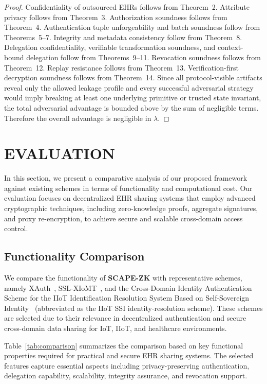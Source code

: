 \documentclass[conference]{IEEEtran}
\begin{document}
\begin{proof}
Confidentiality of outsourced EHRs follows from Theorem~2. Attribute privacy follows from Theorem~3. Authorization soundness follows from Theorem~4. Authentication tuple unforgeability and batch soundness follow from Theorems~5--7. Integrity and metadata consistency follow from Theorem~8. Delegation confidentiality, verifiable transformation soundness, and context-bound delegation follow from Theorems~9--11. Revocation soundness follows from Theorem~12. Replay resistance follows from Theorem~13. Verification-first decryption soundness follows from Theorem~14. Since all protocol-visible artifacts reveal only the allowed leakage profile and every successful adversarial strategy would imply breaking at least one underlying primitive or trusted state invariant, the total adversarial advantage is bounded above by the sum of negligible terms. Therefore the overall advantage is negligible in $\lambda$.
\end{proof}

\section{EVALUATION}
In this section, we present a comparative analysis of our proposed framework against existing schemes in terms of functionality and computational cost. Our evaluation focuses on decentralized EHR sharing systems that employ advanced cryptographic techniques, including zero-knowledge proofs, aggregate signatures, and proxy re-encryption, to achieve secure and scalable cross-domain access control.

\subsection{Functionality Comparison}

We compare the functionality of \textbf{SCAPE-ZK} with representative schemes, namely XAuth~\cite{b6}, SSL-XIoMT~\cite{b8}, and the Cross-Domain Identity Authentication Scheme for the IIoT Identification Resolution System Based on Self-Sovereign Identity~\cite{b30} (abbreviated as the IIoT SSI identity-resolution scheme). These schemes are selected due to their relevance in decentralized authentication and secure cross-domain data sharing for IoT, IIoT, and healthcare environments.

Table~\ref{tab:comparison} summarizes the comparison based on key functional properties required for practical and secure EHR sharing systems. The selected features capture essential aspects including privacy-preserving authentication, delegation capability, scalability, integrity assurance, and revocation support.
\end{document}
